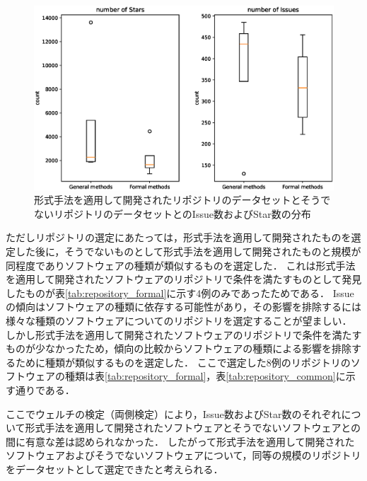 \documentclass[main]{subfiles}
\begin{document}
\begin{figure}[p]
	\centering
	\includegraphics[width=\hsize]{figures/boxplot.eps}
	\caption{形式手法を適用して開発されたリポジトリのデータセットとそうでないリポジトリのデータセットとのIssue数およびStar数の分布}
	\label{fig:boxplot}
\end{figure}

ただしリポジトリの選定にあたっては，形式手法を適用して開発されたものを選定した後に，そうでないものとして形式手法を適用して開発されたものと規模が同程度でありソフトウェアの種類が類似するものを選定した．
これは形式手法を適用して開発されたソフトウェアのリポジトリで条件を満たすものとして発見したものが表\ref{tab:repository_formal}に示す4例のみであったためである．
Issueの傾向はソフトウェアの種類に依存する可能性があり，その影響を排除するには様々な種類のソフトウェアについてのリポジトリを選定することが望ましい．
しかし形式手法を適用して開発されたソフトウェアのリポジトリで条件を満たすものが少なかったため，傾向の比較からソフトウェアの種類による影響を排除するために種類が類似するものを選定した．
ここで選定した8例のリポジトリのソフトウェアの種類は表\ref{tab:repository_formal}，表\ref{tab:repository_common}に示す通りである．

ここでウェルチの検定（両側検定）により，Issue数およびStar数のそれぞれについて形式手法を適用して開発されたソフトウェアとそうでないソフトウェアとの間に有意な差は認められなかった．
したがって形式手法を適用して開発されたソフトウェアおよびそうでないソフトウェアについて，同等の規模のリポジトリをデータセットとして選定できたと考えられる．
\end{document}

